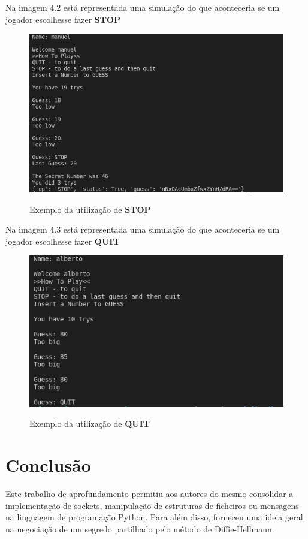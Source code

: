 \documentclass{report}
\begin{document}
Na imagem 4.2 está representada uma simulação do que aconteceria se um jogador escolhesse fazer \textbf{STOP}
\begin{figure}[h]
\center
\includegraphics[scale=0.49]{teste2stop}
\label{pog}
\caption{Exemplo da utilização de \textbf{STOP}}
\end{figure}

Na imagem 4.3 está representada uma simulação do que aconteceria se um jogador escolhesse fazer \textbf{QUIT}

\begin{figure}[h]
\center
\includegraphics[scale=0.49]{teste3quit}
\label{pog}
\caption{Exemplo da utilização de \textbf{QUIT}}
\end{figure}

\section{Conclusão}
Este trabalho de aprofundamento permitiu aos autores do mesmo consolidar a implementação de sockets, manipulação de estruturas de ficheiros ou mensagens na linguagem de programação Python. Para além disso, forneceu uma ideia geral na negociação de um segredo partilhado pelo método de Diffie-Hellmann.
\end{document}

